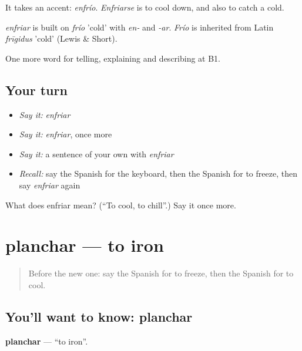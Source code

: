 It takes an accent: \emph{enfrío}. \emph{Enfriarse} is to cool down, and also to catch a cold.

\begin{cousinweb}
\emph{enfriar} is built on \emph{frío} 'cold' with \emph{en-} and \emph{-ar}. \emph{Frío} is inherited from Latin \emph{frīgidus} 'cold' (Lewis \& Short).
\end{cousinweb}

\begin{grammarlens}[title={What you've built}]
One more word for telling, explaining and describing at B1.
\end{grammarlens}

\subsection*{Your turn}
\begin{itemize}
\raggedright
  \item \emph{Say it:} \emph{enfriar}
  \item \emph{Say it:} \emph{enfriar}, once more
  \item \emph{Say it:} a sentence of your own with \emph{enfriar}
  \item \emph{Recall:} say the Spanish for the keyboard, then the Spanish for to freeze, then say \emph{enfriar} again
\end{itemize}

\begin{tcolorbox}[breakable,colback=teal!4,colframe=teal!35!black,title={Before you move on}]
What does enfriar mean? (\textquotedblleft{}To cool, to chill\textquotedblright{}.) Say it once more.
\end{tcolorbox}
\section[planchar]{planchar — to iron}

\label{lesson:ES-C777-planchar}



\begin{quote}
Before the new one: say the Spanish for to freeze, then the Spanish for to cool.
\end{quote}

\subsection*{You'll want to know: planchar}
\textbf{planchar} — \textquotedblleft{}to iron\textquotedblright{}.

